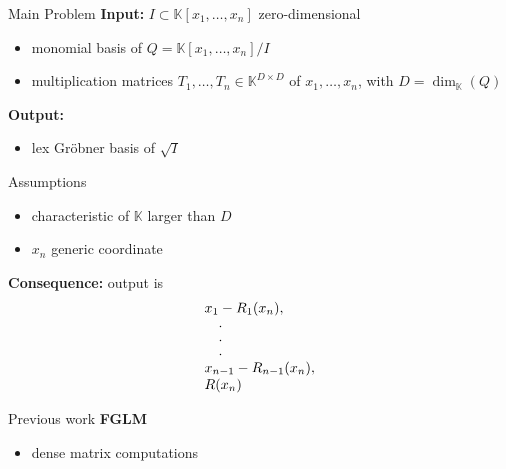 \documentclass[final]{beamer}
\def\myvdots{\vbox{\baselineskip=10pt \lineskiplimit=0pt 
\kern6pt \hbox{.}\hbox{.}\hbox{.}}}
\newlength{\onecolwid}
\begin{document}
\begin{frame}[t]
\begin{columns}[t]
\begin{column}{\onecolwid}


\begin{alertblock}{{\sf Main Problem}}
	\textbf{Input:} {\sf  $I \subset
	\mathbb{K}[x_1,\dots,x_n]$ zero-dimensional}
	\begin{itemize}
        \item {\sf monomial basis of
	$Q = \mathbb{K}[x_1,\dots,x_n]/I$}
	\item {\sf multiplication matrices  $T_1,\dots, T_n \in 
	\mathbb{K}^{D \times D}$ of $x_1,\dots,x_n$, with
	$D = \dim_{\mathbb{K}}(Q)$}
	\end{itemize}
	\textbf{Output:}
	\begin{itemize}
        \item {\sf lex Gr\"obner basis of $\sqrt{I}$}
	\end{itemize}
\end{alertblock}

\begin{alertblock}{{\sf Assumptions}}
	\begin{itemize}
		\item {\sf characteristic of $\mathbb{K}$ larger than $D$}
		\item {\sf $x_n$ generic coordinate}
	\end{itemize}
{\bf Consequence:} {\sf output is}
$$\begin{array}{l}
 x_1-R_1(x_n),   \\
~~~ \myvdots \\
 x_{n-1}-R_{n-1}(x_n),\\
 R(x_n)
\end{array}$$
\end{alertblock}


\begin{alertblock}{{\sf Previous work}}
{} {\bf FGLM}
\begin{itemize}
\item {\sf dense matrix computations}
\end{itemize}


\end{alertblock}
\end{column}
\end{columns}
\end{frame}
\end{document}

